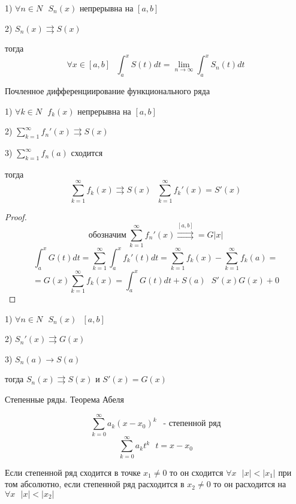 \begin{theorem}
  1) $\forall n \in N ~~~ S_n(x)$ непрерывна на $[a,b]$

  2) $S_n(x) \rightrightarrows S(x)$

  тогда
  $$
  \forall x \in [a,b] ~~~ \int_a^x S(t)dt = \lim_{n \to \infty}
  \int_a^x S_n(t)dt
  $$
\end{theorem}

\begin{title}
  Почленное дифференциирование функционального ряда
\end{title}

\begin{theorem}
  1) $\forall k \in N ~~~ f_k(x)$ непрерывна на $[a,b]$

  2) $\sum_{k=1}^{\infty} f_n'(x) \rightrightarrows S(x)$

  3) $\sum_{k=1}^{\infty} f_n(a)$ сходится

  тогда
  $$
  \sum_{k=1}^{\infty} f_k(x) \rightrightarrows S(x) ~~~
  \sum_{k=1}^{\infty} f_k'(x) = S'(x)
  $$
\end{theorem}

\begin{proof}
  $$
  \text{обозначим} ~ \sum_{k=1}^{\infty} f_n'(x)
  \stackrel{[a,b]}{\rightrightarrows} = G|x|
  $$
  $$
  \int_a^x G(t)dt = \sum_{k=1}^{\infty} \int_a^x f_k'(t) dt =
  \sum_{k=1}^{\infty} f_k(x) - \sum_{k=1}^{\infty} f_k(a) =
  $$
  $$
  = G(x) \sum_{k=1}^{\infty} f_k(x) = \int_a^x G(t)dt + S(a) ~~~ S'(x) G(x) + 0
  $$
\end{proof}

\begin{theorem}
  1) $\forall n \in N ~~~ S_n(x) ~~~ [a,b]$

  2) $S_n'(x) \rightrightarrows G(x)$

  3) $S_n(a) \to S(a)$

  тогда $S_n(x) \rightrightarrows S(x)$ и $S'(x) = G(x)$
\end{theorem}

\begin{title}
  Степенные ряды. Теорема Абеля
\end{title}

\begin{define}
  $$
  \sum_{k=0}^{\infty} a_k (x-x_0)^k ~~ \text{ - степенной ряд}
  $$
  $$
  \sum_{k=0}^{\infty} a_k t^k ~~~ t = x - x_0
  $$
\end{define}

\begin{theorem}[Абеля]
  Если степенной ряд сходится в точке $x_1 \not= 0$ то он сходится
  $\forall x ~~~ |x| < |x_1|$ при том абсолютно, если степенной ряд расходится
  в $x_2 \not= 0$ то он расходится на $\forall x ~~~ |x| < |x_2|$
\end{theorem}

